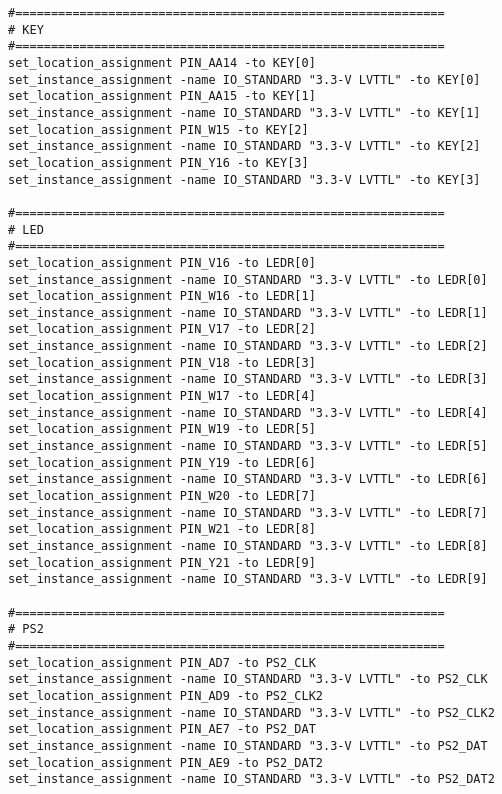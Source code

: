 \documentclass[dvipdfm]{book}
\begin{document}
\begin{verbatim}
#============================================================
# KEY
#============================================================
set_location_assignment PIN_AA14 -to KEY[0]
set_instance_assignment -name IO_STANDARD "3.3-V LVTTL" -to KEY[0]
set_location_assignment PIN_AA15 -to KEY[1]
set_instance_assignment -name IO_STANDARD "3.3-V LVTTL" -to KEY[1]
set_location_assignment PIN_W15 -to KEY[2]
set_instance_assignment -name IO_STANDARD "3.3-V LVTTL" -to KEY[2]
set_location_assignment PIN_Y16 -to KEY[3]
set_instance_assignment -name IO_STANDARD "3.3-V LVTTL" -to KEY[3]

#============================================================
# LED
#============================================================
set_location_assignment PIN_V16 -to LEDR[0]
set_instance_assignment -name IO_STANDARD "3.3-V LVTTL" -to LEDR[0]
set_location_assignment PIN_W16 -to LEDR[1]
set_instance_assignment -name IO_STANDARD "3.3-V LVTTL" -to LEDR[1]
set_location_assignment PIN_V17 -to LEDR[2]
set_instance_assignment -name IO_STANDARD "3.3-V LVTTL" -to LEDR[2]
set_location_assignment PIN_V18 -to LEDR[3]
set_instance_assignment -name IO_STANDARD "3.3-V LVTTL" -to LEDR[3]
set_location_assignment PIN_W17 -to LEDR[4]
set_instance_assignment -name IO_STANDARD "3.3-V LVTTL" -to LEDR[4]
set_location_assignment PIN_W19 -to LEDR[5]
set_instance_assignment -name IO_STANDARD "3.3-V LVTTL" -to LEDR[5]
set_location_assignment PIN_Y19 -to LEDR[6]
set_instance_assignment -name IO_STANDARD "3.3-V LVTTL" -to LEDR[6]
set_location_assignment PIN_W20 -to LEDR[7]
set_instance_assignment -name IO_STANDARD "3.3-V LVTTL" -to LEDR[7]
set_location_assignment PIN_W21 -to LEDR[8]
set_instance_assignment -name IO_STANDARD "3.3-V LVTTL" -to LEDR[8]
set_location_assignment PIN_Y21 -to LEDR[9]
set_instance_assignment -name IO_STANDARD "3.3-V LVTTL" -to LEDR[9]

#============================================================
# PS2
#============================================================
set_location_assignment PIN_AD7 -to PS2_CLK
set_instance_assignment -name IO_STANDARD "3.3-V LVTTL" -to PS2_CLK
set_location_assignment PIN_AD9 -to PS2_CLK2
set_instance_assignment -name IO_STANDARD "3.3-V LVTTL" -to PS2_CLK2
set_location_assignment PIN_AE7 -to PS2_DAT
set_instance_assignment -name IO_STANDARD "3.3-V LVTTL" -to PS2_DAT
set_location_assignment PIN_AE9 -to PS2_DAT2
set_instance_assignment -name IO_STANDARD "3.3-V LVTTL" -to PS2_DAT2


\end{verbatim}
\end{document}
